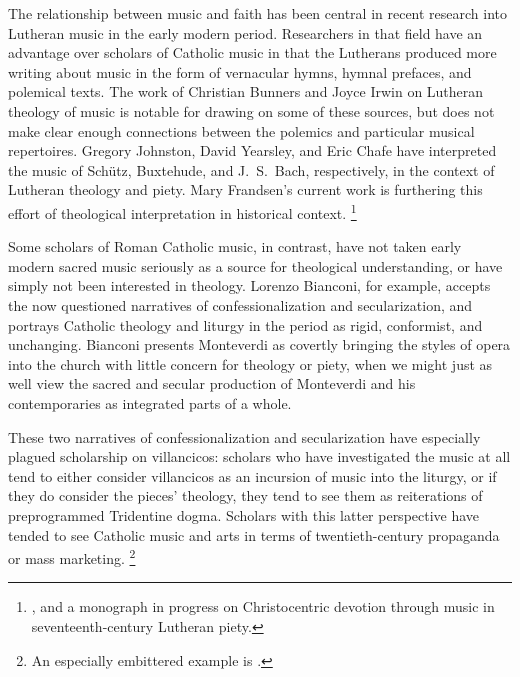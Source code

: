 The relationship between music and faith has been central in recent research into Lutheran music in the early modern period.
Researchers in that field have an advantage over scholars of Catholic music in that the Lutherans produced more writing about music in the form of vernacular hymns, hymnal prefaces, and polemical texts.
The work of Christian Bunners and Joyce Irwin on Lutheran theology of music is notable for drawing on some of these sources, but does not make clear enough connections between the polemics and particular musical repertoires.%
	\autocites{Bunners:Kirchenmusik}{Bunners:Singende}{Irwin:VoiceHeart}
Gregory Johnston, David Yearsley, and Eric Chafe have interpreted the music of Schütz, Buxtehude, and J.~S.~Bach, respectively, in the context of Lutheran theology and piety.%
	\autocites{Johnston:Rhetorical}{Yearsley:Buxtehude}{Yearsley:BachThron}{Chafe:Tonal}
Mary Frandsen's current work is furthering this effort of theological interpretation in historical context.%
	\footnote{%
	\autocite{Frandsen:Crossing}, and a monograph in progress on Christocentric devotion through music in seventeenth-century Lutheran piety.
	}

Some scholars of Roman Catholic music, in contrast, have not taken early modern sacred music seriously as a source for theological understanding, or have simply not been interested in theology. 
Lorenzo Bianconi, for example, accepts the now questioned narratives of confessionalization and secularization, and portrays Catholic theology and liturgy in the period as rigid, conformist, and unchanging.%
	\autocite{Bianconi:17C}
Bianconi presents Monteverdi as covertly bringing the  styles of opera into the church with little concern for theology or piety, when we might just as well view the sacred and secular production of Monteverdi and his contemporaries as integrated parts of a whole.

These two narratives of confessionalization and secularization have especially plagued scholarship on villancicos: scholars who have investigated the music at all tend to either consider villancicos as an incursion of   music into the liturgy, or if they do consider the pieces' theology, they tend to see them as reiterations of preprogrammed Tridentine dogma.
Scholars with this latter perspective have tended to see Catholic music and arts in terms of twentieth-century propaganda or mass marketing.%
	\footnote{%
	An especially embittered example is \autocite{Menache:Vox}.
	}

